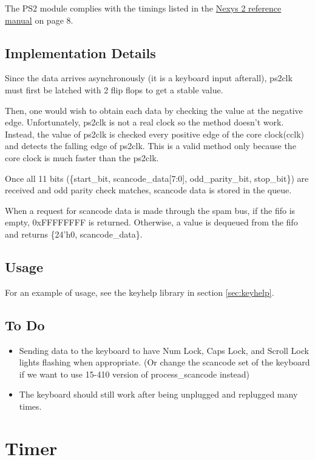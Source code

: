 \documentclass[10pt]{article}
\begin{document}
The PS2 module complies with the timings listed in the
\href{http://www.digilentinc.com/Data/Products/NEXYS2/Nexys2_rm.pdf}{Nexys 2
reference manual} on page 8.

\subsection{Implementation Details}

Since the data arrives asynchronously (it is a keyboard input afterall),
ps2clk must first be latched with 2 flip flops to get a stable value.

Then, one would wish to obtain each data by checking the value at the
negative edge. Unfortunately, ps2clk is not a real clock so the method
doesn't work. Instead, the value of ps2clk is checked every positive edge of
the core clock(cclk) and detects the falling edge of ps2clk. This is a valid
method only because the core clock is much faster than the ps2clk.

Once all 11 bits (\{start\_bit, scancode\_data[7:0], odd\_parity\_bit,
stop\_bit\}) are received and odd parity check matches, scancode data is
stored in the queue.

When a request for scancode data is made through the spam bus, if the fifo
is empty, 0xFFFFFFFF is returned. Otherwise, a value is dequeued from the
fifo and returns \{24'h0, scancode\_data\}.

\subsection{Usage}

For an example of usage, see the keyhelp library in section
\ref{sec:keyhelp}.

\subsection{To Do}

\begin{itemize}
\item{Sending data to the keyboard to have Num Lock, Caps Lock, and Scroll
Lock lights flashing when appropriate. (Or change the scancode set of the
keyboard if we want to use 15-410 version of process\_scancode instead)}
\item{The keyboard should still work after being unplugged and replugged
many times.}
\end{itemize}


\section{Timer}
\end{document}

